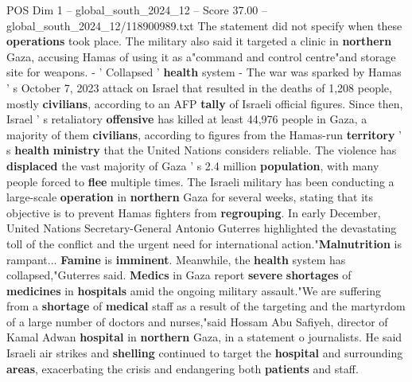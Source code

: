 \begin{textsample}{POS Dim 1 – global\_south\_2024\_12 – Score 37.00 – global\_south\_2024\_12/118900989.txt}
The statement did not specify when these \textbf{operations} took place.
The military also said it targeted a clinic in \textbf{northern} Gaza, accusing Hamas of using it as a"command and control centre"and storage site for weapons. - ' Collapsed ' \textbf{health} system - The war was sparked by Hamas ' s October 7, 2023 attack on Israel that resulted in the deaths of 1,208 people, mostly \textbf{civilians}, according to an AFP \textbf{tally} of Israeli official figures.
Since then, Israel ' s retaliatory \textbf{offensive} has killed at least 44,976 people in Gaza, a majority of them \textbf{civilians}, according to figures from the Hamas-run \textbf{territory} ' s \textbf{health} \textbf{ministry} that the United Nations considers reliable.
The violence has \textbf{displaced} the vast majority of Gaza ' s 2.4 million \textbf{population}, with many people forced to \textbf{flee} multiple times.
The Israeli military has been conducting a large-scale \textbf{operation} in \textbf{northern} Gaza for several weeks, stating that its objective is to prevent Hamas fighters from \textbf{regrouping}.
In early December, United Nations Secretary-General Antonio Guterres highlighted the devastating toll of the conflict and the urgent need for international action."\textbf{Malnutrition} is rampant... \textbf{Famine} is \textbf{imminent}.
Meanwhile, the \textbf{health} system has collapsed,"Guterres said. \textbf{Medics} in Gaza report \textbf{severe} \textbf{shortages} of \textbf{medicines} in \textbf{hospitals} amid the ongoing military assault."We are suffering from a \textbf{shortage} of \textbf{medical} staff as a result of the targeting and the martyrdom of a large number of doctors and nurses,"said Hossam Abu Safiyeh, director of Kamal Adwan \textbf{hospital} in \textbf{northern} Gaza, in a statement o journalists.
He said Israeli air strikes and \textbf{shelling} continued to target the \textbf{hospital} and surrounding \textbf{areas}, exacerbating the crisis and endangering both \textbf{patients} and staff.

\end{textsample}
